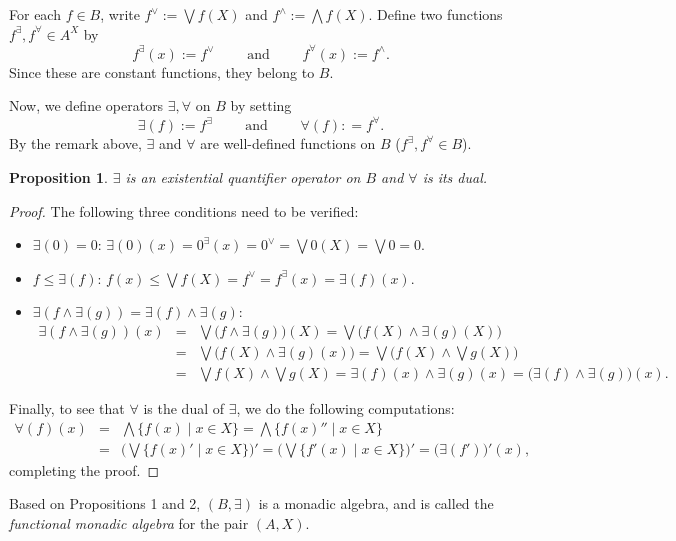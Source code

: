 \documentclass[12pt]{article}
\newtheorem{prop}{Proposition}
\begin{document}
For each $f\in B$, write $f^{\vee}:=\bigvee f(X)$ and $f^{\wedge}:=\bigwedge f(X)$.  Define two functions $f^{\exists},f^{\forall}\in A^X$ by $$f^{\exists}(x):=f^{\vee}\qquad\mbox{ and }\qquad f^{\forall}(x):=f^{\wedge}.$$
Since these are constant functions, they belong to $B$.

Now, we define operators $\exists ,\forall$ on $B$ by setting $$\exists (f):=f^{\exists}\qquad \mbox { and }\qquad \forall (f): = f^{\forall}.$$
By the remark above, $\exists$ and $\forall$ are well-defined functions on $B$ ($f^{\exists},f^{\forall}\in B$).

\begin{prop} $\exists$ is an existential quantifier operator on $B$ and $\forall$ is its dual. \end{prop}
\begin{proof} The following three conditions need to be verified:
\begin{itemize}
\item $\exists(0)=0$: $\exists(0)(x)=0^{\exists}(x)=0^{\vee}=\bigvee 0(X)=\bigvee 0=0$.
\item $f\le \exists(f)$: $f(x)\le \bigvee f(X)=f^{\vee}=f^{\exists}(x)=\exists(f)(x)$.
\item $\exists(f\wedge \exists(g))=\exists(f)\wedge \exists(g)$: 
\begin{eqnarray*}
\exists(f\wedge \exists(g))(x) &=& \bigvee \big(f\wedge \exists(g)\big)(X) = \bigvee \big(f(X)\wedge \exists(g)(X)\big) \\ &=& \bigvee \big(f(X)\wedge \exists(g)(x)\big) = \bigvee \big(f(X)\wedge \bigvee g(X)\big) \\
&=& \bigvee f(X) \wedge \bigvee g(X) = \exists(f)(x) \wedge \exists(g)(x) = \big(\exists(f)\wedge \exists(g)\big)(x).
\end{eqnarray*}
\end{itemize}
Finally, to see that $\forall$ is the dual of $\exists$, we do the following computations: 
\begin{eqnarray*}
\forall (f)(x) &=& \bigwedge \lbrace f(x)\mid x\in X\rbrace =\bigwedge \lbrace f(x)'' \mid x\in X\rbrace \\ &=& \big( \bigvee \lbrace f(x)'\mid x\in X\rbrace \big)'=\big( \bigvee \lbrace f'(x)\mid x\in X\rbrace \big)'=\big(\exists(f')\big)'(x),
\end{eqnarray*}
completing the proof.
\end{proof}

Based on Propositions 1 and 2, $(B,\exists)$ is a monadic algebra, and is called the \emph{functional monadic algebra} for the pair $(A,X)$.
\end{document}
